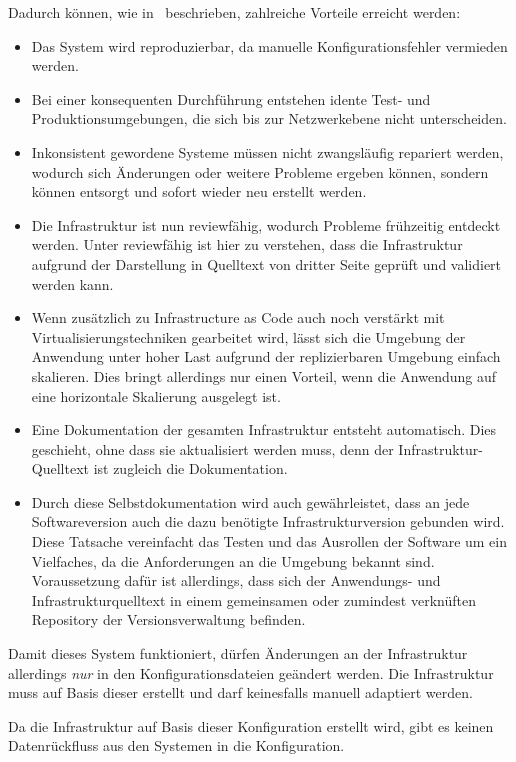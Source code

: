 Dadurch können, wie in~\autocite[64\psqq]{Wolff201604} beschrieben, zahlreiche Vorteile erreicht werden:
\begin{itemize}
    \item Das System wird reproduzierbar, da manuelle Konfigurationsfehler vermieden werden.
    \item Bei einer konsequenten Durchführung entstehen idente Test- und Produktionsumgebungen, die sich bis zur Netzwerkebene nicht unterscheiden.
    \item Inkonsistent gewordene Systeme müssen nicht zwangsläufig repariert werden, wodurch sich Änderungen oder weitere Probleme ergeben können, sondern können entsorgt und sofort wieder neu erstellt werden.
    \item Die Infrastruktur ist nun reviewfähig, wodurch Probleme frühzeitig entdeckt werden. Unter reviewfähig ist hier zu verstehen, dass die Infrastruktur aufgrund der Darstellung in Quelltext von dritter Seite geprüft und validiert werden kann.
    \item Wenn zusätzlich zu Infrastructure as Code auch noch verstärkt mit Virtualisierungstechniken gearbeitet wird, lässt sich die Umgebung der Anwendung unter hoher Last aufgrund der replizierbaren Umgebung einfach skalieren. Dies bringt allerdings nur einen Vorteil, wenn die Anwendung auf eine horizontale Skalierung ausgelegt ist.
    \item Eine Dokumentation der gesamten Infrastruktur entsteht automatisch. Dies geschieht, ohne dass sie aktualisiert werden muss, denn der Infrastruktur-Quelltext ist zugleich die Dokumentation.
    \item Durch diese Selbstdokumentation wird auch gewährleistet, dass an jede Softwareversion auch die dazu benötigte Infrastrukturversion gebunden wird. Diese Tatsache vereinfacht das Testen und das Ausrollen der Software um ein Vielfaches, da die Anforderungen an die Umgebung bekannt sind. Voraussetzung dafür ist allerdings, dass sich der Anwendungs- und Infrastrukturquelltext in einem gemeinsamen oder zumindest verknüften Repository der Versionsverwaltung befinden.
\end{itemize}
Damit dieses System funktioniert, dürfen Änderungen an der Infrastruktur allerdings \emph{nur} in den Konfigurationsdateien geändert werden.
Die Infrastruktur muss auf Basis dieser erstellt und darf keinesfalls manuell adaptiert werden.


 Da die Infrastruktur auf Basis dieser Konfiguration erstellt wird, gibt es keinen Datenrückfluss aus den Systemen in die Konfiguration.



